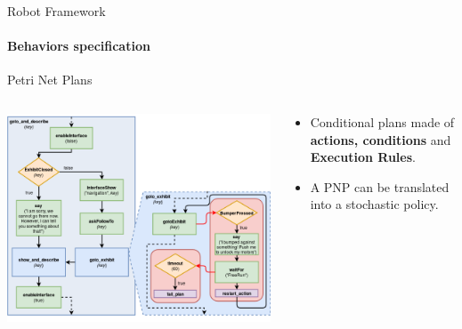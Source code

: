 \documentclass[english,svgnames,notes=hide,14pt]{beamer}
\begin{document}
\begin{frame}[shrink=20]{Robot Framework}
    \framesubtitle{Behaviors specification}
    \begin{block}{Petri Net Plans}
        \begin{columns}
            \begin{column}{8cm}
                \centering
                \includegraphics[width=1.05\linewidth]{imgs/lindsey_example_pnp.png}
            \end{column}
            \begin{column}{4cm}
              {\larger
                \begin{itemize}
                    \item Conditional plans made of \textbf{actions, conditions} and \textbf{Execution Rules}.
                    \item A PNP can be translated into a stochastic policy.
                \end{itemize}
              }
            \end{column}
        \end{columns}
    \end{block}
\end{frame}
\end{document}
